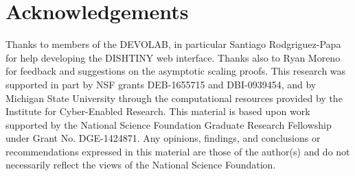 \section{Acknowledgements}

Thanks to members of the DEVOLAB, in particular Santiago Rodgriguez-Papa for help developing the DISHTINY web interface.
Thanks also to Ryan Moreno for feedback and suggestions on the asymptotic scaling proofs.
This research was supported in part by NSF grants DEB-1655715 and DBI-0939454, and by Michigan State University through the computational resources provided by the Institute for Cyber-Enabled Research.
This material is based upon work supported by the National Science Foundation Graduate Research Fellowship under Grant No. DGE-1424871.
Any opinions, findings, and conclusions or recommendations expressed in this material are those of the author(s) and do not necessarily reflect the views of the National Science Foundation.
